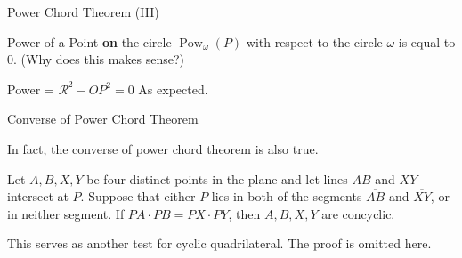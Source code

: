 \documentclass{beamer}
\DeclareMathOperator{\Pow}{Pow}
\begin{document}
\begin{frame}{Power Chord Theorem (III)}
	\begin{center}
		\begin{minipage}{0.9\textwidth}
			\begin{block}{Power of a Point \textbf{on} the circle}
				$\Pow_\omega(P)$ with respect to the circle $\omega$ is equal to $0$. (Why does this makes sense?)
			\end{block}
			\begin{block}{Power = $\mathcal{R}^2-OP^2=0$}
				As expected.
			\end{block}
		\end{minipage}
	\end{center}
\end{frame}

\begin{frame}{Converse of Power Chord Theorem}
	\begin{center}
		\begin{minipage}{0.9\textwidth}
			In fact, the converse of power chord theorem is also true.	
			\begin{theorem}
				Let $A,B,X,Y$ be four distinct points in the plane and let lines  $AB$ and  $XY$ intersect at $P$. Suppose that either $P$ lies in both of the segments $\overline{AB}$ and $\overline{XY}$, or in neither segment. If $PA \cdot PB = PX \cdot PY$, then $A, B, X, Y$ are concyclic.
			\end{theorem}
			This serves as another test for cyclic quadrilateral. The proof is omitted here.
		\end{minipage}
	\end{center}
\end{frame}
\end{document}
